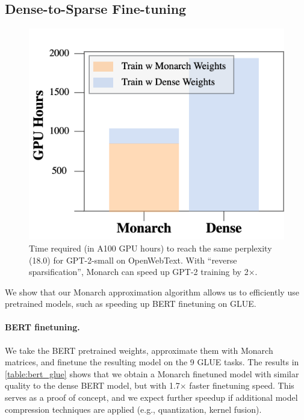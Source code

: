 \subsection{Dense-to-Sparse Fine-tuning}
\label{subsec:finetuning}

\begin{figure}[t]
  \centering
  \vspace{-3mm}
  \includegraphics[width=.3\textwidth]{figures/rv_bar_temp.png}
  \vspace{-3mm}
  \caption{\label{fig:reverse_sparsification_bar}Time required (in A100 GPU hours) to reach the same perplexity (18.0)
    for GPT-2-small on OpenWebText.
    With ``reverse sparsification'', Monarch can speed up
    GPT-2 training by 2$\times$.\vspace{-1em}}
\end{figure}

We show that our Monarch approximation algorithm allows us to efficiently use
pretrained models, such as speeding up BERT finetuning on GLUE.

\paragraph{BERT finetuning.}
We take the BERT pretrained weights, approximate them with Monarch matrices,
and finetune the resulting model on the 9 GLUE tasks.
The results in \cref{table:bert_glue} shows that we obtain a Monarch finetuned
model with similar quality to the dense BERT model, but with 1.7$\times$ faster
finetuning speed.
This serves as a proof of concept, and we expect further speedup if additional model compression techniques are applied (e.g., quantization, kernel fusion).




